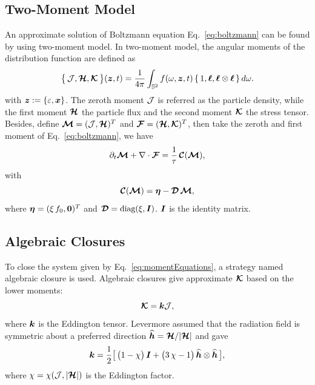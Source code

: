 \subsection{Two-Moment Model}
An approximate solution of Boltzmann equation Eq.~\eqref{eq:boltzmann} can be found by using two-moment model.
In two-moment model, the angular moments of the distribution function are defined as
\begin{equation}
  \big\{\,\mathcal{J},\boldsymbol{\mathcal{H}},\boldsymbol{\mathcal{K}}\,\big\}(\boldsymbol{z},t)
  =\frac{1}{4\pi}\int_{\mathbb{S}^{2}}f(\omega,\boldsymbol{z},t)\,\{\,1,\boldsymbol{\ell},\boldsymbol{\ell}\otimes\boldsymbol{\ell}\,\}\,d\omega.  
  \label{eq:angularMoments}
\end{equation}
with $\boldsymbol{z}:=\{\varepsilon,\boldsymbol{x}\}$.
The zeroth moment $\mathcal{J}$ is referred as the particle density, while the first moment $\boldsymbol{\mathcal{H}}$ the particle flux and the second moment $\boldsymbol{\mathcal{K}}$ the stress tensor.
Besides, define $\boldsymbol{\mathcal{M}}=(\mathcal{J},\boldsymbol{\mathcal{H}})^{T}$ and $\boldsymbol{\mathcal{F}}=(\boldsymbol{\mathcal{H}},\boldsymbol{\mathcal{K}})^{T}$, then take the zeroth and first moment of Eq.~\eqref{eq:boltzmann}, we have
\begin{equation}
  \partial_{t}{\boldsymbol{\mathcal{M}}}+\nabla\cdot\boldsymbol{\mathcal{F}}=\frac{1}{\tau}\,\boldsymbol{\mathcal{C}}(\boldsymbol{\mathcal{M}}),
  \label{eq:momentEquations}
\end{equation}
with
\begin{equation}
  \boldsymbol{\mathcal{C}}(\boldsymbol{\mathcal{M}})=\boldsymbol{\eta}-\boldsymbol{\mathcal{D}}\,\boldsymbol{\mathcal{M}},
  \label{eq:collisionTermMoments}
\end{equation}
where $\boldsymbol{\eta}=(\xi\,f_{0},\boldsymbol{0})^{T}$ and $\boldsymbol{\mathcal{D}}=\mbox{diag}(\xi,\boldsymbol{I})$.
$\boldsymbol{I}$ is the identity matrix.  

\subsection{Algebraic Closures }
To close the system given by Eq.~\eqref{eq:momentEquations}, a strategy named algebraic closure is used.
Algebraic closures give approximate $\boldsymbol{\mathcal{K}}$ based on the lower moments:
\begin{equation}
\boldsymbol{\mathcal{K}} = \boldsymbol{k} \mathcal{J},
\end{equation}
where $\boldsymbol{k}$ is the Eddington tensor.
Levermore\cite{levermore_1984} assumed that the radiation field is symmetric about a preferred direction $\widehat{\boldsymbol{h}}=\boldsymbol{\mathcal{H}}/|\boldsymbol{\mathcal{H}}|$ and gave 
\begin{equation}
  \boldsymbol{k}=\frac{1}{2}\big[\,\big(1-\chi\big)\,\boldsymbol{I}+\big(3\,\chi-1\big)\,\widehat{\boldsymbol{h}}\otimes\widehat{\boldsymbol{h}}\,\big],
  \label{eq:eddingtonTensor}
\end{equation}
where $\chi=\chi(\mathcal{J},|\boldsymbol{\mathcal{H}}|)$ is the Eddington factor. 

